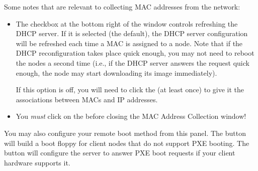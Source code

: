 \noindent Some notes that are relevant to collecting MAC addresses from the
network:

\begin{itemize}
\item The  checkbox at the bottom right of
  the window controls refreshing the DHCP server.  If it is selected
  (the default), the DHCP server configuration will be refreshed each
  time a MAC is assigned to a node.  Note that if the DHCP
  reconfiguration takes place quick enough, you may not need to reboot
  the nodes a second time (i.e., if the DHCP server answers the
  request quick enough, the node may start downloading its image
  immediately).

  If this option is off, you will need to click the  (at least once) to give it the associations between
  MACs and IP addresses.


\item You {\em must} click on the  before
  closing the MAC Address Collection window!
\end{itemize}

You may also configure your remote boot method from this panel. The
 button will build a boot floppy for
client nodes that do not support PXE booting. The  button will configure the server to answer PXE boot
requests if your client hardware supports it. 


